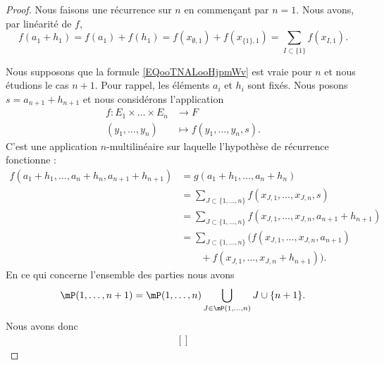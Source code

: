 \begin{proof}
	Nous faisons une récurrence sur \( n\) en commençant par \( n=1\). Nous avons, par linéarité de \( f\),
	\begin{equation}
		f(a_1+h_1)=f(a_1)+f(h_1)=f(x_{\emptyset,1})+f(x_{\{ 1 \},1})=\sum_{I\subset\{ 1 \}}f(x_{I,1}).
	\end{equation}

	Nous supposons que la formule \eqref{EQooTNALooHjpmWv} est vraie pour \( n\) et nous étudions le cas \( n+1\). Pour rappel, les éléments \( a_i\) et \( h_i\) sont fixés. Nous posons \( s=a_{n+1}+h_{n+1}\) et nous considérons l'application
	\begin{equation}
		\begin{aligned}
			f\colon E_1\times \ldots\times E_n & \to F                        \\
			(y_1,\ldots,y_n)                   & \mapsto f(y_1,\ldots,y_n,s).
		\end{aligned}
	\end{equation}
	C'est une application \( n\)-multilinéaire sur laquelle l'hypothèse de récurrence fonctionne :
	\begin{subequations}
		\begin{align}
			f(a_1+h_1,\ldots,a_n+h_n,a_{n+1}+h_{n+1}) & = g(a_1+h_1,\ldots,a_n+h_n)                                                      \\
			                                          & =\sum_{J\subset\{ 1,\ldots,n \}}f(x_{J,1},\ldots,x_{J,n},s)                      \\
			                                          & =\sum_{J\subset\{ 1,\ldots,n \}}f(x_{J,1},\ldots,x_{J,n},a_{n+1}+h_{n+1})        \\
			                                          & =\sum_{J\subset\{ 1,\ldots,n \}}\Big( f(x_{J,1},\ldots,x_{J,n},a_{n+1})\nonumber \\
			                                          & \qquad+f(x_{J,1},\ldots,x_{J,n}+h_{n+1}) \Big).\label{SUBEQooRCIFooUQdjXS}
		\end{align}
	\end{subequations}
	En ce qui concerne l'ensemble des parties nous avons
	\begin{equation}
		\mP(1,\ldots,n+1)=\mP(1,\ldots,n)\bigcup_{J\in \mP(1,\ldots,n)}J\cup\{ n+1 \}.
	\end{equation}
	Nous avons donc
	\begin{equation}		\label{EQooKDGYooVFgPWb}
		\begin{aligned}[]

\end{aligned}
\end{equation}
\end{proof}
